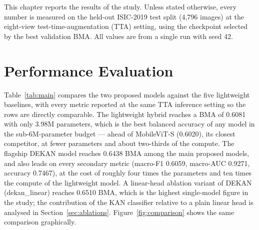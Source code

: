 This chapter reports the results of the study. Unless stated otherwise, every
number is measured on the held-out ISIC-2019 test split (4{,}796 images) at the
eight-view test-time-augmentation (TTA) setting, using the checkpoint selected by
the best validation BMA. All values are from a single run with seed 42.

\section{Performance Evaluation}

Table~\ref{tab:main} compares the two proposed models against the five
lightweight baselines, with every metric reported at the same TTA inference
setting so the rows are directly comparable. The lightweight hybrid reaches a BMA
of 0.6081 with only 3.98M parameters, which is the best balanced accuracy of any
model in the sub-6M-parameter budget --- ahead of MobileViT-S (0.6020), its
closest competitor, at fewer parameters and about two-thirds of the compute.
The flagship DEKAN model reaches 0.6438 BMA among the main proposed models, and
also leads on every secondary metric (macro-F1 0.6059, macro-AUC 0.9271,
accuracy 0.7467), at the cost of roughly four times the parameters and ten times
the compute of the lightweight model. A linear-head ablation variant of DEKAN
(dekan\_linear) reaches 0.6510 BMA, which is the highest single-model figure in
the study; the contribution of the KAN classifier relative to a plain linear head
is analysed in Section~\ref{sec:ablations}. Figure~\ref{fig:comparison} shows
the same comparison graphically.

